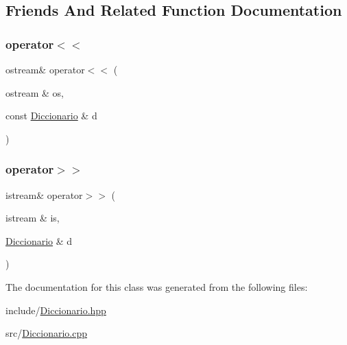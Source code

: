 \subsection{Friends And Related Function Documentation}
\mbox{\label{class_diccionario_a3d353aed1ab1b515fcf2be6172123b1e}} 
\subsubsection{\texorpdfstring{operator$<$$<$}{operator<<}}
{\footnotesize\ttfamily ostream\& operator$<$$<$ (\begin{DoxyParamCaption}\item[{ostream \&}]{os,  }\item[{const \mbox{\hyperlink{class_diccionario}{Diccionario}} \&}]{d }\end{DoxyParamCaption})\hspace{0.3cm}{\ttfamily [friend]}}

\mbox{\label{class_diccionario_a37fecf9dd09405cc2cc91e81bf32cab0}} 
\subsubsection{\texorpdfstring{operator$>$$>$}{operator>>}}
{\footnotesize\ttfamily istream\& operator$>$$>$ (\begin{DoxyParamCaption}\item[{istream \&}]{is,  }\item[{\mbox{\hyperlink{class_diccionario}{Diccionario}} \&}]{d }\end{DoxyParamCaption})\hspace{0.3cm}{\ttfamily [friend]}}



The documentation for this class was generated from the following files\+:\begin{DoxyCompactItemize}
\item 
include/\mbox{\hyperlink{_diccionario_8hpp}{Diccionario.\+hpp}}\item 
src/\mbox{\hyperlink{_diccionario_8cpp}{Diccionario.\+cpp}}\end{DoxyCompactItemize}
